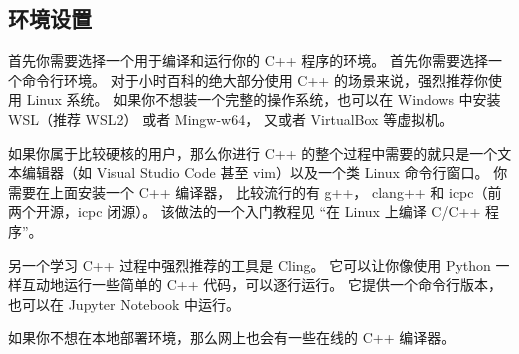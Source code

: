 
\subsection{环境设置}
首先你需要选择一个用于编译和运行你的 C++ 程序的环境。 首先你需要选择一个命令行环境。 对于小时百科的绝大部分使用 C++ 的场景来说，强烈推荐你使用 Linux 系统。 如果你不想装一个完整的操作系统，也可以在 Windows 中安装 WSL（推荐 WSL2） 或者 Mingw-w64， 又或者 VirtualBox 等虚拟机。

如果你属于比较硬核的用户，那么你进行 C++ 的整个过程中需要的就只是一个文本编辑器（如 Visual Studio Code 甚至 vim）以及一个类 Linux 命令行窗口。 你需要在上面安装一个 C++ 编译器， 比较流行的有 g++， clang++ 和 icpc（前两个开源，icpc 闭源）。 该做法的一个入门教程见 “在 Linux 上编译 C/C++ 程序”。

另一个学习 C++ 过程中强烈推荐的工具是 Cling。 它可以让你像使用 Python 一样互动地运行一些简单的 C++ 代码，可以逐行运行。 它提供一个命令行版本，也可以在 Jupyter Notebook 中运行。

如果你不想在本地部署环境，那么网上也会有一些在线的 C++ 编译器。

